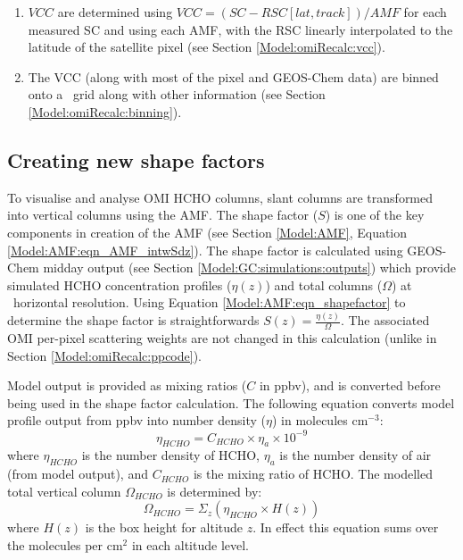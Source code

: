 \begin{enumerate}
\begin{enumerate}
        \item These corrections are binned by satellite detector (track: 1-60), and latitude (0.36\degr; 500 latitudes from 90{\degr}S to 90{\degr}N).
        \item The median entry of each bin is determined and this forms the RSC[lat,track] (e.g., Figure \ref{Model:omiRecalc:RSC:fig_track_correction_interpolations}).
      \end{enumerate}
      \item $VCC$ are determined using $VCC = (SC - RSC[lat,track] )/AMF$ for each measured SC and using each AMF, with the RSC linearly interpolated to the latitude of the satellite pixel (see Section \ref{Model:omiRecalc:vcc}).
      \item The VCC (along with most of the pixel and GEOS-Chem data) are binned onto a \highhr ~grid along with other information (see Section \ref{Model:omiRecalc:binning}).
    \end{enumerate}
 
    
      
  
  \subsection{Creating new shape factors}
    \label{Model:omiRecalc:shape_factors}
    To visualise and analyse OMI HCHO columns, slant columns are transformed into vertical columns using the AMF.
    The shape factor ($S$) is one of the key components in creation of the AMF (see Section \ref{Model:AMF}, Equation \ref{Model:AMF:eqn_AMF_intwSdz}).
    The shape factor is calculated using GEOS-Chem midday output (see Section \ref{Model:GC:simulations:outputs}) which provide simulated HCHO concentration profiles ($\eta(z)$) and total columns ($\Omega$) at \lowhr ~horizontal resolution.
    Using Equation \ref{Model:AMF:eqn_shapefactor} to determine the shape factor is straightforwards $S(z) = \frac{\eta(z)}{\Omega}$.
    The associated OMI per-pixel scattering weights are not changed in this calculation (unlike in Section \ref{Model:omiRecalc:ppcode}).
    
    Model output is provided as mixing ratios ($C$ in ppbv), and is converted before being used in the shape factor calculation.
    The following equation converts model profile output from ppbv into number density ($\eta$) in molecules cm$^{-3}$:
    \begin{equation} \label{Model:omiRecalc:eqn_ppb_to_n}
      \eta_{HCHO} = C_{HCHO} \times \eta_a \times 10^{-9}
    \end{equation}
    where $\eta_{HCHO}$ is the number density of HCHO, $\eta_a$ is the number density of air (from model output), and $C_{HCHO}$ is the mixing ratio of HCHO.
    The modelled total vertical column $\Omega_{HCHO}$ is determined by:
    \begin{equation*}
      \Omega_{HCHO} = \Sigma_z \left( \eta_{HCHO} \times H(z) \right)
    \end{equation*}
    where $H(z)$ is the box height for altitude $z$.
    In effect this equation sums over the molecules per cm$^2$ in each altitude level.
    
